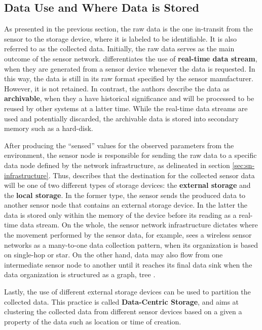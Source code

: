 \subsection{Data Use and Where Data is Stored}
\label{sec:sn-data-purpose}
\label{sec:sn-storage-locations}

As presented in the previous section, the raw data is the one in-transit from
the sensor to the storage device, where it is labeled to be
identifiable. It is also referred to as the collected data. 
Initially, the raw data serves as the main outcome of the sensor network.
\cite{sn-provenance} differentiates the use of \textbf{real-time data stream}, when they are generated from a sensor
device whenever the data is requested. In this way, the data is still in its raw
format specified by the sensor manufacturer. However, it is not retained. 
In contrast, the authors describe the data as \textbf{archivable}, when they a
have historical significance and will be processed to be reused by other systems at
a latter time. While the real-time data streams are used and potentially
discarded, the archivable data is stored into secondary memory such as a
hard-disk.

After producing the ``sensed'' values for the observed parameters from the
environment, the sensor node is responsible for sending the raw data to a specific
data node defined by the network infrastructure, as delineated in section
\ref{sec:sn-infrastructure}. Thus, \cite{sn-storage03}
describes that the destination for the collected sensor data will be one of two
different types of storage devices: the \textbf{external storage} and the
\textbf{local storage}. In the former type, the sensor sends the
produced data to another sensor node that contains an external storage device.
In the latter the data is stored only within the memory of the device before its 
reading as a real-time data stream. On the whole, the sensor network
infrastructure dictates where the movement performed by the sensor data,
for example, \cite{sn-storage02} sees a wireless sensor networks as a many-to-one data
collection pattern, when its organization is based on single-hop or star. On
the other hand, data may also flow from one intermediate sensor node to another
until it reaches its final data sink when the data organization is structured
as a graph, tree \cite{sn-storage01, sn-storage03}.

Lastly, the use of different external storage devices can be used
to partition the collected data. This practice is called \textbf{Data-Centric
Storage}, and aims at clustering the collected data from different sensor
devices based on a given a property of the data such as location or time of
creation.


